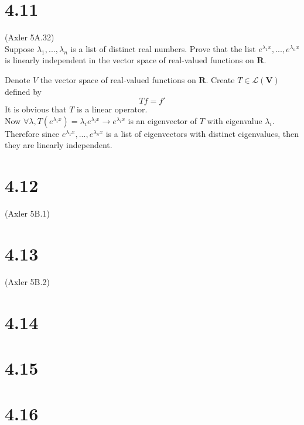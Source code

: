 \documentclass{article}
\begin{document}
\section*{4.11}
(Axler 5A.32)\\
Suppose $\lambda_1, ..., \lambda_n$ is a list of distinct real numbers. Prove that the list $e^{\lambda_1x}, ..., e^{\lambda_nx}$ is linearly independent in the vector space of real-valued functions on $\mathbf{R}$.
\begin{addmargin}[1em]{0em}
    Denote $V$ the vector space of real-valued functions on $\mathbf{R}$. Create $T \in \mathcal{L}(\mathbf{V})$ defined by
    \begin{equation*}
        Tf = f'
    \end{equation*}
    It is obvious that $T$ is a linear operator.\\
    Now $\forall \lambda, T(e^{\lambda_i x}) = \lambda_ie^{\lambda_ix} \rightarrow e^{\lambda_ix}$ is an eigenvector of $T$ with eigenvalue $\lambda_i$.\\
    Therefore since $e^{\lambda_1x}, ..., e^{\lambda_nx}$ is a list of eigenvectors with distinct eigenvalues, then they are linearly independent.
\end{addmargin}
\section*{4.12}
(Axler 5B.1)
\section*{4.13}
(Axler 5B.2)
\section*{4.14}
\section*{4.15}
\section*{4.16}
\end{document}
